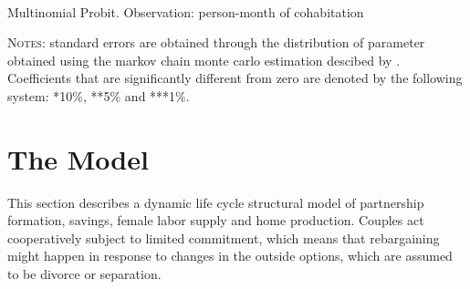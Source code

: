 \documentclass[12pt]{article}
\numberwithin{table}{section}
\begin{document}
	\begin{table}[htbp]\centering
		\caption{\\Multinomial Probit. Observation: person-month of cohabitation}
		\label{table:mpc}
		\begin{threeparttable}[t]\centering
			
			\begin{tablenotes}[flushleft]
				\footnotesize{\item \textsc{Notes}: standard errors are obtained through the distribution of parameter obtained using the markov chain monte carlo estimation descibed by \cite{imai2005a}.
					Coefficients that are significantly different from zero are denoted by the following system: *10\%, **5\%  and ***1\%.}
			\end{tablenotes}
		\end{threeparttable}
	\end{table}

\FloatBarrier
\FloatBarrier
\section{The Model}
This section describes a dynamic life cycle structural model of partnership formation, savings, female labor supply and  home production. Couples act cooperatively subject to limited commitment, which means that rebargaining might happen in response to changes in the outside options, which are assumed to be divorce or separation.
\end{document}
